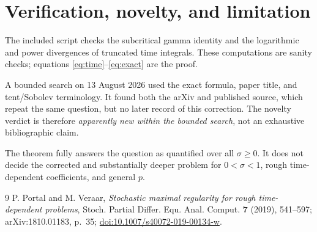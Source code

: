 \documentclass[10pt]{article}
\begin{document}
\section{Verification, novelty, and limitation}

The included script checks the subcritical gamma identity and the logarithmic
and power divergences of truncated time integrals. These computations are
sanity checks; equations \eqref{eq:time}--\eqref{eq:exact} are the proof.

A bounded search on 13 August 2026 used the exact formula, paper title, and
tent/Sobolev terminology. It found both the arXiv and published source, which
repeat the same question, but no later record of this correction. The novelty
verdict is therefore \emph{apparently new within the bounded search}, not an
exhaustive bibliographic claim.

The theorem fully answers the question as quantified over all
$\sigma\geq0$. It does not decide the corrected and substantially deeper
problem for $0<\sigma<1$, rough time-dependent coefficients, and general
$p$.

\begin{thebibliography}{9}
P. Portal and M. Veraar,
\emph{Stochastic maximal regularity for rough time-dependent problems},
Stoch. Partial Differ. Equ. Anal. Comput. \textbf{7} (2019), 541--597;
arXiv:1810.01183, p.~35;
\href{https://doi.org/10.1007/s40072-019-00134-w}{doi:10.1007/s40072-019-00134-w}.
\end{thebibliography}
\end{document}
